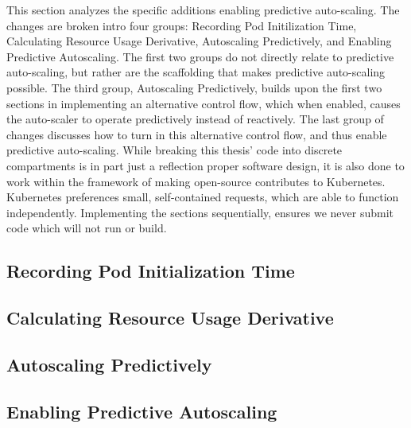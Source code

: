 This section analyzes the specific additions enabling predictive auto-scaling.
The changes are broken intro four groups: Recording Pod Initilization Time,
Calculating Resource Usage Derivative, Autoscaling Predictively, and Enabling
Predictive Autoscaling. The first two groups do not directly relate to
predictive auto-scaling, but rather are the scaffolding that makes predictive
auto-scaling possible. The third group, Autoscaling Predictively, builds upon
the first two sections in implementing an alternative control flow, which when
enabled, causes the auto-scaler to operate predictively instead of reactively.
The last group of changes discusses how to turn in this alternative control
flow, and thus enable predictive auto-scaling. While breaking this thesis' code
into discrete compartments is in part just a reflection proper software design,
it is also done to work within the framework of making open-source contributes
to Kubernetes. Kubernetes preferences small, self-contained requests, which are
able to function independently. Implementing the sections sequentially, ensures
we never submit code which will not run or build.

\subsection{Recording Pod Initialization Time}



\subsection{Calculating Resource Usage Derivative}



\subsection{Autoscaling Predictively}



\subsection{Enabling Predictive Autoscaling}


